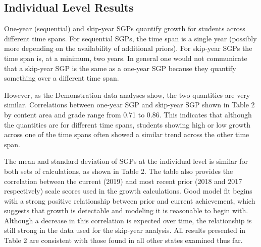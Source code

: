 \documentclass[12pt]{article}
\begin{document}
\hypertarget{individual-level-results}{%
\subsection{Individual Level Results}\label{individual-level-results}}

One-year (sequential) and skip-year SGPs quantify growth for students
across different time spans. For sequential SGPs, the time span is a
single year (possibly more depending on the availability of additional
priors). For skip-year SGPs the time span is, at a minimum, two years.
In general one would not communicate that a skip-year SGP is the same as
a one-year SGP because they quantify something over a different time
span.

However, as the Demonstration data analyses show, the two quantities are
very similar. Correlations between one-year SGP and skip-year SGP shown
in Table 2 by content area and grade range from 0.71 to 0.86. This
indicates that although the quantities are for different time spans,
students showing high or low growth across one of the time spans often
showed a similar trend across the other time span.

The mean and standard deviation of SGPs at the individual level is
similar for both sets of calculations, as shown in Table 2. The table
also provides the correlation between the current (2019) and most recent
prior (2018 and 2017 respectively) scale scores used in the growth
calculations. Good model fit begins with a strong positive relationship
between prior and current achievement, which suggests that growth is
detectable and modeling it is reasonable to begin with. Although a
decrease in this correlation is expected over time, the relationship is
still strong in the data used for the skip-year analysis. All results
presented in Table 2 are consistent with those found in all other states
examined thus far.
\end{document}
